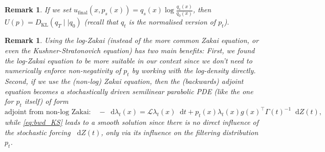 \documentclass[10pt]{article}
\numberwithin{equation}{section}
\numberwithin{figure}{section}
\newtheorem{rem}[thm]{Remark}
\theoremstyle{remark}
\newcommand{\cL}{\mathcal L}
\newcommand{\dd }{\mathop{}\!\mathrm{d}}
\begin{document}
\begin{rem}
    If we set $u_\mathrm{final}(x,p_s(x)) = q_s(x)\log \frac{q_s(x)}{q_0(x)}$, then $U(p) = D_{\mathrm{KL}}(q_T\mid\mid q_0)$ (recall that $q_t$ is the normalised version of $p_t$).
\end{rem}
\begin{rem}
    Using the log-Zakai (instead of the more common Zakai equation, or even the Kushner-Stratonovich equation) has two main benefits: First, we found the log-Zakai equation to be more suitable in our context since we don't need to numerically enforce non-negativity of $p_t$ by working with the log-density directly. Second, if we use the (non-log) Zakai equation, then the (backwards) adjoint equation becomes a stochastically driven semilinear parabolic PDE (like the one for $p_t$ itself) of form
    \begin{equation*}
        \text{adjoint from non-log Zakai:} \quad-\dd \lambda_t(x) = \cL \lambda_t(x)\dd t + p_t(x)\lambda_t(x) g(x)^\top \Gamma(t)^{-1}\dd Z(t),
    \end{equation*}
    while \eqref{eq:bwd_KS} leads to a smooth solution since there is no direct influence of the stochastic forcing $\dd Z(t)$, only via its influence on the filtering distribution $p_t$.
\end{rem}
\end{document}
